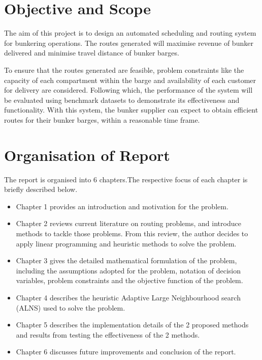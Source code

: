 \section{Objective and Scope}

The aim of this project is to design an automated scheduling and routing system for bunkering operations. The routes generated will maximise revenue of bunker delivered and minimise travel distance of bunker barges. \par 
To ensure that the routes generated are feasible, problem constraints like the capacity of each compartment within the barge and availability of each customer for delivery are considered. Following which, the performance of the system will be evaluated using benchmark datasets to demonstrate its effectiveness and functionality. With this system, the bunker supplier can expect to obtain efficient routes for their bunker barges, within a reasonable time frame.

\section{Organisation of Report}
The report is organised into 6 chapters.The respective focus of each 
chapter is briefly described below. \par
\begin{itemize}
\item Chapter 1 provides an introduction and motivation for the problem.
\item Chapter 2 reviews current literature on routing problems, and introduce methods to tackle those problems. From this review, the author decides to apply linear programming and heuristic methods to solve the problem.
\item Chapter 3 gives the detailed mathematical formulation of the problem, including the
assumptions adopted for the problem, notation of decision variables, problem constraints 
and the objective function of the problem.
\item Chapter 4 describes the heuristic Adaptive Large Neighbourhood search (ALNS) used to solve the problem.
\item Chapter 5 describes the implementation details of the 2 proposed methods and results from testing the effectiveness of the 2 methods. 
\item Chapter 6 discusses future improvements and conclusion of the report.
\end{itemize}

